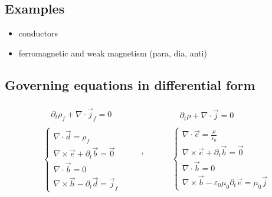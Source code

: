 \documentclass[letterpaper,10pt,english]{jupyterBook}
\begin{document}
\subsection{Examples}
\label{\detokenize{ch/principles-matter:examples}}\begin{itemize}
\item {} 
\sphinxAtStartPar
conductors

\item {} 
\sphinxAtStartPar
ferromagnetic and weak magnetism (para\sphinxhyphen{}, dia\sphinxhyphen{}, anti\sphinxhyphen{})

\end{itemize}


\subsection{Governing equations in differential form}
\label{\detokenize{ch/principles-matter:governing-equations-in-differential-form}}\label{\detokenize{ch/principles-matter:classical-electromagnetism-media-differential}}\begin{equation*}
\begin{split}\begin{aligned}
& \quad \partial_t \rho_f + \nabla \cdot \vec{j}_f = 0 \\ \\
& \begin{cases}
 \nabla \cdot \vec{d} = \rho_f \\
 \nabla \times \vec{e} + \partial_t \vec{b} = \vec{0} \\
 \nabla \cdot \vec{b} = 0 \\
 \nabla \times \vec{h} - \partial_t \vec{d} = \vec{j}_f
\end{cases} \\
\end{aligned}
\qquad , \qquad
\begin{aligned}
& \quad \partial_t \rho + \nabla \cdot \vec{j} = 0 \\ \\
& \begin{cases}
 \nabla \cdot \vec{e} = \frac{\rho}{\varepsilon_0} \\
 \nabla \times \vec{e} + \partial_t \vec{b} = \vec{0} \\
 \nabla \cdot \vec{b} = 0 \\
 \nabla \times \vec{b} - \varepsilon_0 \mu_0 \partial_t \vec{e} = \mu_0 \vec{j}
\end{cases} \\
\end{aligned}\end{split}
\end{equation*}
\end{document}
